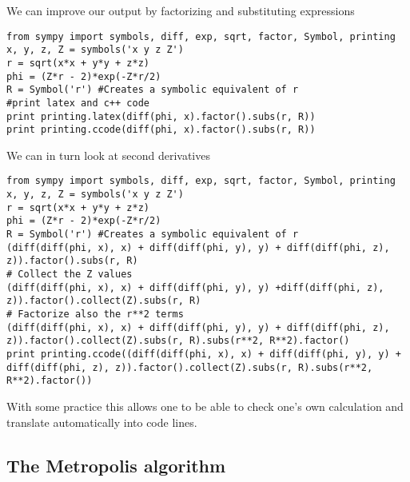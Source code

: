 We can improve our output by factorizing and substituting expressions









\begin{verbatim}
from sympy import symbols, diff, exp, sqrt, factor, Symbol, printing
x, y, z, Z = symbols('x y z Z')
r = sqrt(x*x + y*y + z*z)
phi = (Z*r - 2)*exp(-Z*r/2)
R = Symbol('r') #Creates a symbolic equivalent of r
#print latex and c++ code
print printing.latex(diff(phi, x).factor().subs(r, R))
print printing.ccode(diff(phi, x).factor().subs(r, R))

\end{verbatim}


We can in turn look at second derivatives












\begin{verbatim}
from sympy import symbols, diff, exp, sqrt, factor, Symbol, printing
x, y, z, Z = symbols('x y z Z')
r = sqrt(x*x + y*y + z*z)
phi = (Z*r - 2)*exp(-Z*r/2)
R = Symbol('r') #Creates a symbolic equivalent of r
(diff(diff(phi, x), x) + diff(diff(phi, y), y) + diff(diff(phi, z), z)).factor().subs(r, R)
# Collect the Z values
(diff(diff(phi, x), x) + diff(diff(phi, y), y) +diff(diff(phi, z), z)).factor().collect(Z).subs(r, R)
# Factorize also the r**2 terms
(diff(diff(phi, x), x) + diff(diff(phi, y), y) + diff(diff(phi, z), z)).factor().collect(Z).subs(r, R).subs(r**2, R**2).factor()
print printing.ccode((diff(diff(phi, x), x) + diff(diff(phi, y), y) + diff(diff(phi, z), z)).factor().collect(Z).subs(r, R).subs(r**2, R**2).factor())

\end{verbatim}

With some practice this allows one to be able to check one's own calculation and translate automatically into code lines.

\subsection*{The Metropolis algorithm}


